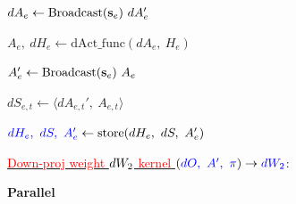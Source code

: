 \begin{figure}[t]
\begin{minipage}{0.51\textwidth}
\begin{algorithm}[H]
{    $dA_{e} \gets \mathrm{Broadcast}(\vs_e) \ dA_{e}'$ \;

     \;


    $A_{e}, \ dH_{e} \gets \mathrm{dAct\_func}(dA_{e}, \ H_e)$ \; 


    $A_{e}' \gets \mathrm{Broadcast}(\vs_e)\ A_{e}$ \;


    $d S_{e,t} \gets \langle dA_{e,t}', \ A_{e,t}\rangle$  \;
            
    $\textcolor{blue}{d H_e, \ dS, \ A_{e}' }\gets \mathrm{store}(d H_e, \ dS, \ A_{e}')$
 
    }
    

    

    \Indm
    
    \underline{\textcolor{red}{Down-proj weight $dW_{2}$ kernel} $(\textcolor{blue}{dO, \ A', \ \pi}) \rightarrow \textcolor{blue}{dW_{2}}$}:  \;

    \;

    \Indp

    \textbf{Parallel} 

    


\end{algorithm}
\end{minipage}
\end{figure}
